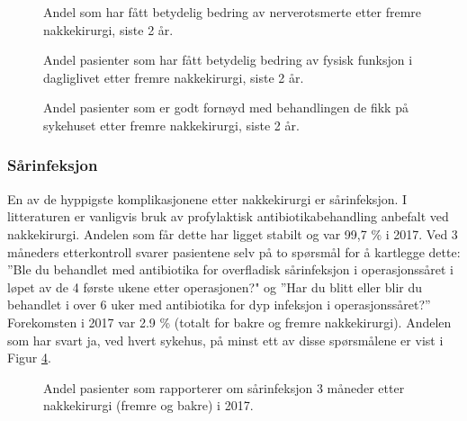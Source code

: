 \documentclass [norsk,a4paper,twoside]{article}\usepackage[]{graphicx}\usepackage[]{color}
\begin{document}
\begin{figure}[ht]
\caption{\label{fig:NakkeNRSsmerteArmEndr12mndUmFSh} Andel som har fått betydelig bedring av nerverotsmerte  etter fremre nakkekirurgi, siste 2 år.}
\end{figure}

\begin{figure}[ht]
\caption{\label{fig:NakkeNDIendr12mndUmFSh} Andel pasienter som har fått betydelig bedring av fysisk funksjon i dagliglivet etter fremre nakkekirurgi, siste 2 år.}
\end{figure}

\begin{figure}[ht]
\caption{\label{fig:NakkeFornoydBeh12mndFremSh} Andel pasienter som er godt fornøyd med behandlingen de fikk på sykehuset etter fremre nakkekirurgi, siste 2 år.}
\end{figure}


\clearpage

\subsubsection{Sårinfeksjon }


En av de hyppigste komplikasjonene etter nakkekirurgi er sårinfeksjon. I litteraturen er vanligvis bruk av profylaktisk antibiotikabehandling  anbefalt ved 
nakkekirurgi. Andelen som får dette har ligget stabilt og var 99,7 \% i 2017.
Ved  3 måneders etterkontroll svarer pasientene selv 
på to spørsmål  for å kartlegge dette: ''Ble du behandlet med antibiotika for overfladisk sårinfeksjon i operasjonssåret i løpet av de 4 første ukene etter operasjonen?" og 
''Har du blitt eller blir du behandlet i over 6 uker med antibiotika for dyp infeksjon i operasjonssåret?''  Forekomsten i 2017 var 
2.9 \% (totalt for bakre og fremre nakkekirurgi).  Andelen som har svart ja, ved hvert sykehus, på minst ett av disse spørsmålene er vist i Figur \ref{fig:NakkeKomplinfek3mndSh}.  

\begin{figure}[ht]
\caption{\label{fig:NakkeKomplinfek3mndSh} Andel pasienter som rapporterer om sårinfeksjon 3 måneder etter nakkekirurgi (fremre og bakre) i 2017. }
\end{figure}
\end{document}
